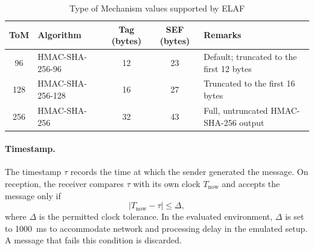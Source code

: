 \begin{table}[htbp]
  \centering
  \caption{Type of Mechanism values supported by ELAF}
  \label{tab:tom}
  \renewcommand{\arraystretch}{1.2}
  \begin{tabularx}{\textwidth}{@{}c l c c X@{}}
    \toprule
    \textbf{ToM} & \textbf{Algorithm} & \textbf{Tag (bytes)} & \textbf{SEF (bytes)} & \textbf{Remarks}                                \\
    \midrule
    96           & HMAC-SHA-256-96    & 12                   & 23                   & Default; truncated to the first 12 bytes         \\
    128          & HMAC-SHA-256-128   & 16                   & 27                   & Truncated to the first 16 bytes                  \\
    256          & HMAC-SHA-256       & 32                   & 43                   & Full, untruncated HMAC-SHA-256 output            \\
    \bottomrule
  \end{tabularx}
\end{table}

\paragraph{Timestamp.} The timestamp $\tau$ records the time at which the sender generated the message. On reception, the receiver compares $\tau$ with its own clock $T_{\mathrm{now}}$ and accepts the message only if
\begin{equation}
  \left| T_{\mathrm{now}} - \tau \right| \le \Delta ,
  \label{eq:freshness}
\end{equation}
where $\Delta$ is the permitted clock tolerance. In the evaluated environment, $\Delta$ is set to 1000~ms to accommodate network and processing delay in the emulated setup. A message that fails this condition is discarded.

